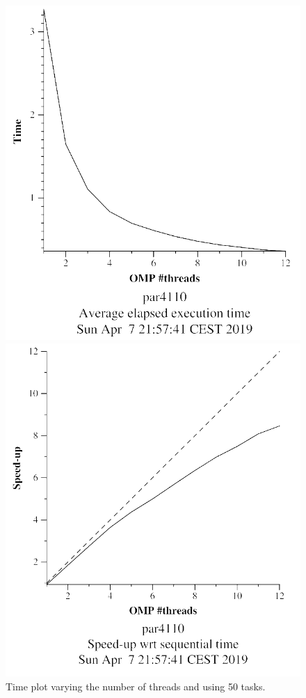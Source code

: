 \documentclass[12pt, a4paper]{article}
\begin{document}
\begin{figure}[H]
\begin{minipage}[t]{0.48\linewidth}
  \centering
  \includegraphics[scale=0.5]{./mandel-omp-10000-strong-omp-24-50-time}
  \caption{Time plot varying the number of threads and using 50 tasks.}
  \label{fig:mandel-omp-10000-strong-omp-24-50-time}
\end{minipage}%
\hspace{0.5cm}
\begin{minipage}[t]{0.48\linewidth}
  \centering
  \includegraphics[scale=0.5]{./mandel-omp-10000-strong-omp-24-50-speedup}

\end{minipage}
\end{figure}
\end{document}
